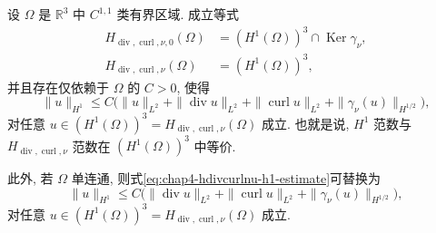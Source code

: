 \begin{Theorem}
\label{thm:chap4-hdivcurlnu-equals-h1}
设 $\Omega$ 是 $\mathbb R^3$ 中 $C^{1,1}$ 类有界区域. 成立等式
\begin{align}
 H_{\operatorname{div},\operatorname{curl},\nu,0}(\Omega)
 &=(H^1(\Omega))^3\cap\operatorname{Ker}\gamma_\nu,
 \label{eq:chap4-hdivcurlnu-zero-equals-h1}\\
 H_{\operatorname{div},\operatorname{curl},\nu}(\Omega)
 &=(H^1(\Omega))^3,
 \label{eq:chap4-hdivcurlnu-equals-h1}
\end{align}
并且存在仅依赖于 $\Omega$ 的 $C>0$, 使得
\begin{equation}
 \|u\|_{H^1}\leq C\bigl(
 \|u\|_{L^2}+\|\operatorname{div}u\|_{L^2}
 +\|\operatorname{curl}u\|_{L^2}+\|\gamma_\nu(u)\|_{H^{1/2}}\bigr),
 \label{eq:chap4-hdivcurlnu-h1-estimate}
\end{equation}
对任意 $u\in(H^1(\Omega))^3=H_{\operatorname{div},\operatorname{curl},\nu}(\Omega)$ 成立.
也就是说, $H^1$ 范数与 $H_{\operatorname{div},\operatorname{curl},\nu}$ 范数在
$(H^1(\Omega))^3$ 中等价.

此外, 若 $\Omega$ 单连通, 则式\eqref{eq:chap4-hdivcurlnu-h1-estimate}可替换为
\begin{equation}
 \|u\|_{H^1}\leq C\bigl(
 \|\operatorname{div}u\|_{L^2}+\|\operatorname{curl}u\|_{L^2}
 +\|\gamma_\nu(u)\|_{H^{1/2}}\bigr),
 \label{eq:chap4-hdivcurlnu-poincare-estimate}
\end{equation}
对任意 $u\in(H^1(\Omega))^3=H_{\operatorname{div},\operatorname{curl},\nu}(\Omega)$ 成立.
\end{Theorem}

